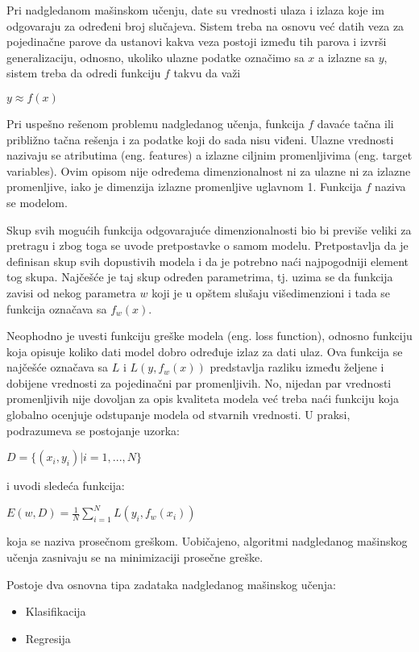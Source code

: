 Pri nadgledanom mašinskom učenju, date su vrednosti ulaza i izlaza koje im odgovaraju za određeni broj slučajeva. Sistem treba na osnovu već datih veza za pojedinačne parove da ustanovi kakva veza postoji između tih parova i izvrši generalizaciju, odnosno, ukoliko ulazne podatke označimo sa $x$ a izlazne sa $y$, sistem treba da odredi funkciju $f$ takvu da važi
\begin{center}
	$y \approx f(x)$
\end{center}
Pri uspešno rešenom problemu nadgledanog učenja, funkcija $f$ davaće tačna ili približno tačna rešenja i za podatke koji do sada nisu viđeni.
Ulazne vrednosti nazivaju se atributima (eng. features) a izlazne ciljnim promenljivima (eng. target variables). Ovim opisom nije određema dimenzionalnost ni za ulazne ni za izlazne promenljive, iako je dimenzija izlazne promenljive uglavnom 1. Funkcija $f$ naziva se modelom. \par
Skup svih mogućih funkcija odgovarajuće dimenzionalnosti bio bi previše veliki za pretragu i zbog toga se uvode pretpostavke o samom modelu. Pretpostavlja da je definisan skup svih dopustivih modela i da je potrebno naći najpogodniji element tog skupa. Najčešće je taj skup određen parametrima, tj. uzima se da funkcija zavisi od nekog parametra $w$ koji je u opštem slušaju višedimenzioni i tada se funkcija označava sa $f_w(x)$.

\par
Neophodno je uvesti funkciju greške modela (eng. loss function), odnosno funkciju koja opisuje koliko dati model dobro određuje izlaz za dati ulaz. Ova funkcija se najčešće označava sa $L$ i $L(y, f_w(x))$ predstavlja razliku između željene i dobijene vrednosti za pojedinačni par promenljivih. No, nijedan par vrednosti promenljivih nije dovoljan za opis kvaliteta modela već treba naći funkciju koja globalno ocenjuje odstupanje modela od stvarnih vrednosti. U praksi, podrazumeva se postojanje uzorka:
\begin{center}
	$D=\{(x_i, y_i)|i=1,...,N\}$
\end{center}
i uvodi sledeća funkcija:
\begin{center}
	$E(w, D) = \frac{1}{N}\sum_{i=1}^{N}L(y_i, f_w(x_i))$
\end{center}
koja se naziva prosečnom greškom. Uobičajeno, algoritmi nadgledanog mašinskog učenja zasnivaju se na minimizaciji prosečne greške. \par

Postoje dva osnovna tipa zadataka nadgledanog mašinskog učenja:
\begin{itemize}
	\item Klasifikacija 
	\item Regresija
\end{itemize}

